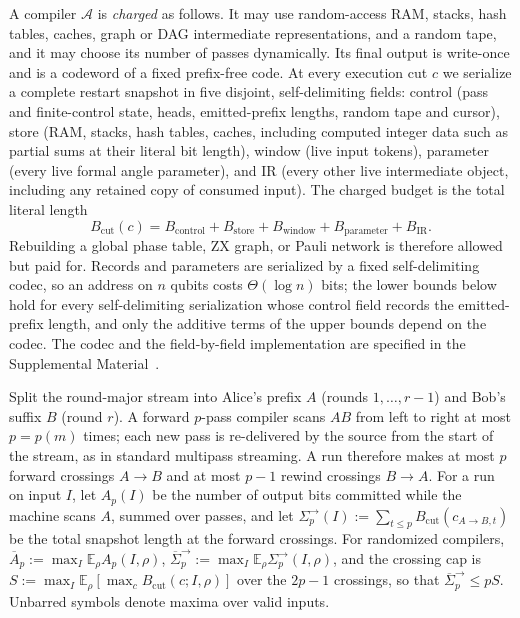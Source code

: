 A compiler $\mathcal A$ is \emph{charged} as follows.  It may use
random-access RAM, stacks, hash tables, caches, graph or DAG
intermediate representations, and a random tape, and it may choose its
number of passes dynamically.  Its final output is write-once and is a
codeword of a fixed prefix-free code.  At every execution cut $c$ we
serialize a complete restart snapshot in five disjoint, self-delimiting
fields: control (pass and finite-control state, heads, emitted-prefix
lengths, random tape and cursor), store (RAM, stacks, hash tables, caches,
including computed integer data such as partial sums at their literal bit
length), window (live input tokens), parameter (every live formal angle
parameter), and IR (every other live intermediate object, including any
retained copy of consumed input).  The charged budget is the total literal
length
\begin{equation}
\label{eq:info-budget}
 B_{\mathrm{cut}}(c)=B_{\mathrm{control}}+B_{\mathrm{store}}
 +B_{\mathrm{window}}+B_{\mathrm{parameter}}+B_{\mathrm{IR}}.
\end{equation}
Rebuilding a global phase table, ZX graph, or Pauli network is therefore
allowed but paid for.  Records and parameters are serialized by a fixed
self-delimiting codec, so an address on $n$ qubits costs
$\Theta(\log n)$ bits; the lower bounds below hold for every
self-delimiting serialization whose control field records the
emitted-prefix length, and only the additive terms of the upper bounds
depend on the codec.  The codec and the field-by-field implementation are
specified in the Supplemental Material~\cite{supplement}.

\begin{definition}
\label{def:w1-pass-accounting}
Split the round-major stream into Alice's prefix $A$ (rounds
$1,\ldots,r-1$) and Bob's suffix $B$ (round $r$).  A forward $p$-pass
compiler scans $AB$ from left to right at most $p=p(m)$ times; each new
pass is re-delivered by the source from the start of the stream, as in
standard multipass streaming.  A run therefore makes at most $p$ forward
crossings $A\to B$ and at most $p-1$ rewind crossings $B\to A$.  For a run
on input $I$, let $A_p(I)$ be the number of output bits committed while
the machine scans $A$, summed over passes, and let
$\Sigma^{\to}_p(I):=\sum_{t\leq p}B_{\mathrm{cut}}(c_{A\to B,t})$ be the
total snapshot length at the forward crossings.  For randomized
compilers, $\overline A_p:=\max_I\mathbb E_\rho A_p(I,\rho)$,
$\overline\Sigma^{\to}_p:=\max_I\mathbb E_\rho\Sigma^{\to}_p(I,\rho)$,
and the crossing cap is
$S:=\max_I\mathbb E_\rho[\max_cB_{\mathrm{cut}}(c;I,\rho)]$ over the
$2p-1$ crossings, so that $\overline\Sigma^{\to}_p\leq pS$.  Unbarred
symbols denote maxima over valid inputs.
\end{definition}

